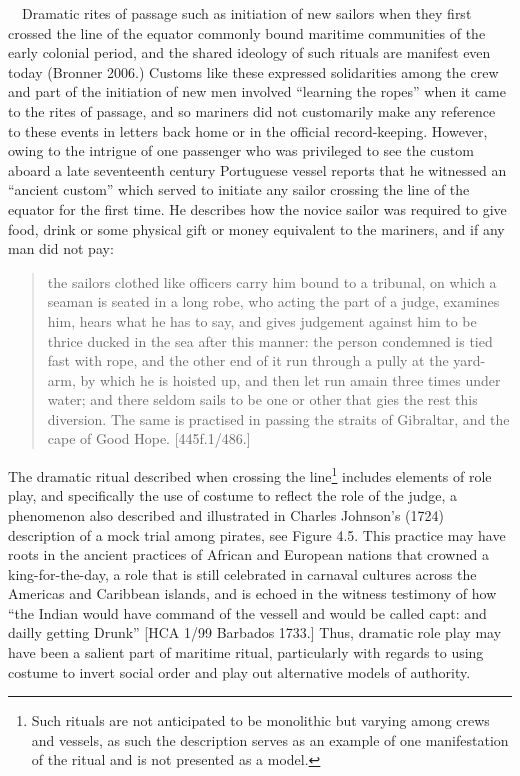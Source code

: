 \begin{styleStandard}
\ \ Dramatic rites of passage such as initiation of new sailors when they first crossed the line of the equator commonly bound maritime communities of the early colonial period, and the shared ideology of such rituals are manifest even today (Bronner 2006.) Customs like these expressed solidarities among the crew and part of the initiation of new men involved “learning the ropes” when it came to the rites of passage, and so mariners did not customarily make any reference to these events in letters back home or in the official record-keeping. However, owing to the intrigue of one passenger who was privileged to see the custom aboard a late seventeenth century Portuguese vessel reports that he witnessed an “ancient custom” which served to initiate any sailor crossing the line of the equator for the first time. He describes how the novice sailor was required to give food, drink or some physical gift or money equivalent to the mariners, and if any man did not pay: 
\end{styleStandard}


\begin{quotation}
the sailors clothed like officers carry him bound to a tribunal, on which a seaman is seated in a long robe, who acting the part of a judge, examines him, hears what he has to say, and gives judgement against him to be thrice ducked in the sea after this manner: the person condemned is tied fast with rope, and the other end of it run through a pully at the yard-arm, by which he is hoisted up, and then let run amain three times under water; and there seldom sails to be one or other that gies the rest this diversion. The same is practised in passing the straits of Gibraltar, and the cape of Good Hope. [445f.1/486.] 

\end{quotation}
\begin{styleStandard}
The dramatic ritual described when crossing the line\footnote{ Such rituals are not anticipated to be monolithic but varying among crews and vessels, as such the description serves as an example of one manifestation of the ritual and is not presented as a model. } includes elements of role play, and specifically the use of costume to reflect the role of the judge, a phenomenon also described and illustrated in Charles Johnson’s (1724) description of a mock trial among pirates, see Figure 4.5. This practice may have roots in the ancient practices of African and European nations that crowned a king-for-the-day, a role that is still celebrated in carnaval cultures across the Americas and Caribbean islands, and is echoed in the witness testimony of how “the Indian would have command of the vessell and would be called capt: and dailly getting Drunk” [HCA 1/99 Barbados 1733.] Thus, dramatic role play may have been a salient part of maritime ritual, particularly with regards to using costume to invert social order and play out alternative models of authority. 
\end{styleStandard}


